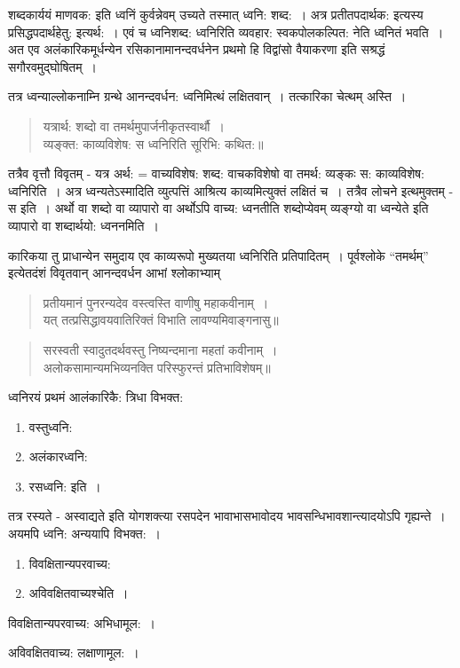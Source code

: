 {शब्दकार्ययं माणवक: इति ध्वनिं कुर्वन्नेवम् उच्यते तस्मात् ध्वनि: शब्द:~। अत्र प्रतीतपदार्थक: इत्यस्य प्रसिद्धपदार्थहेतु: इत्यर्थ:~। एवं च ध्वनिशब्द: ध्वनिरिति व्यवहार: स्वकपोलकल्पित: नेति ध्वनितं भवति~। अत एव अलंकारिकमूर्धन्येन रसिकानामानन्दवर्धनेन प्रथमो हि विद्वांसो वैयाकरणा इति सश्रद्धं सगौरवमुद्घोषितम्~। 

तत्र ध्वन्याल्लोकनाम्नि ग्रन्थे आनन्दवर्धन: ध्वनिमित्थं लक्षितवान्~। तत्कारिका चेत्थम् अस्ति~। 
\begin{verse}
यत्रार्थ: शब्दो वा तमर्थमुपार्जनीकृतस्वार्थौ~। \\
व्यङ्क्त: काव्यविशेष: स ध्वनिरिति सूरिभि: कथित:॥
\end{verse}
तत्रैव वृत्तौ विवृतम् - यत्र अर्थ: = वाच्यविशेष: शब्द: वाचकविशेषो वा तमर्थ: व्यङ्कः स: काव्यविशेष: ध्वनिरिति~। अत्र ध्वन्यतेऽस्मादिति व्युत्पत्तिं आश्रित्य काव्यमित्युक्तं लक्षितं च~। तत्रैव लोचने इत्थमुक्तम् - स इति~। अर्थो वा शब्दो वा व्यापारो वा अर्थोऽपि वाच्य: ध्वनतीति शब्दोप्येवम् व्यङ्ग्यो वा ध्वन्येते इति व्यापारो वा शब्दार्थयो: ध्वननमिति~। 

कारिकया तु प्राधान्येन समुदाय एव काव्यरूपो मुख्यतया ध्वनिरिति प्रतिपादितम्~। पूर्वश्लोके “तमर्थम्” इत्येतदंशं विवृतवान् आनन्दवर्धन आभां श्लोकाभ्याम् 
\begin{verse}
प्रतीयमानं पुनरन्यदेव वस्त्वस्ति वाणीषु महाकवीनाम्~। \\
यत् तत्प्रसिद्धावयवातिरिक्तं विभाति लावण्यमिवाङ्गनासु॥
\end{verse}
\begin{verse}
सरस्वती स्वादुतदर्थवस्तु निष्यन्दमाना महतां कवीनाम्~। \\
अलोकसामान्यमभिव्यनक्ति परिस्फुरन्तं प्रतिभाविशेषम्॥
\end{verse}
ध्वनिरयं प्रथमं आलंकारिकै: त्रिधा विभक्त:
\begin{enumerate}
\item वस्तुध्वनि:
\item अलंकारध्वनि:
\item रसध्वनि: इति~। 
\end{enumerate}

तत्र रस्यते - अस्वाद्यते इति योगशक्त्या रसपदेन भावाभासभावोदय भावसन्धिभावशान्त्यादयोऽपि गृह्यन्ते~। अयमपि ध्वनि: अन्ययापि विभक्त:~। 
\begin{enumerate}
\item विवक्षितान्यपरवाच्य:
\item अविवक्षितवाच्यश्चेति~। 
\end{enumerate}
विवक्षितान्यपरवाच्य: अभिधामूल:~। 

अविवक्षितवाच्य: लक्षाणामूल:~। 

}
